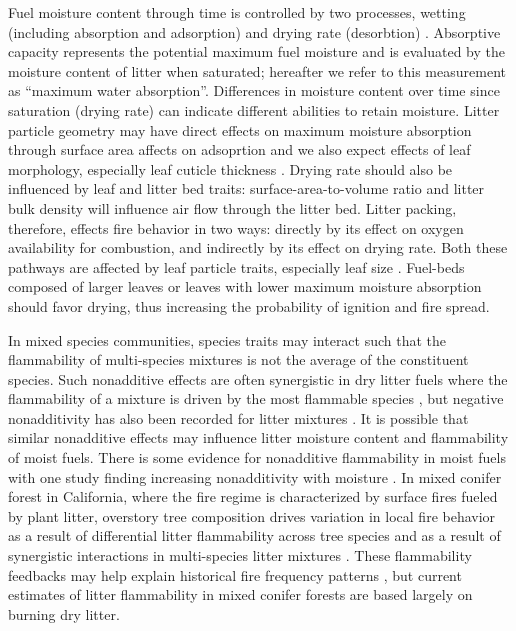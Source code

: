 \documentclass[letterpaper,12pt]{article}
\begin{document}
Fuel moisture content through time is controlled by two processes, wetting
(including absorption and adsorption) and drying rate (desorbtion)
\citep{Anderson-1990, Kreye+Kobziar+etal-2013}. Absorptive capacity represents
the potential maximum fuel moisture and is evaluated by the moisture content of
litter when saturated; hereafter we refer to this measurement as ``maximum
water absorption''. Differences in moisture content over time since saturation
(drying rate) can indicate different abilities to retain moisture. Litter
particle geometry may have direct effects on maximum moisture absorption
through surface area affects on adsoprtion and we also expect effects of leaf
morphology, especially leaf cuticle thickness \citep{Van_Wagner-1969}. Drying
rate should also be influenced by leaf and litter bed traits:
surface-area-to-volume ratio and litter bulk density will influence air flow
through the litter bed. Litter packing, therefore, effects fire behavior in two
ways: directly by its effect on oxygen availability for combustion, and
indirectly by its effect on drying rate. Both these pathways are affected by
leaf particle traits, especially leaf size \citep{Scarff+Westoby-2006}.
Fuel-beds composed of larger leaves or leaves with lower maximum moisture absorption
should favor drying, thus increasing the probability of ignition and fire
spread.

In mixed species communities, species traits may interact such that the
flammability of multi-species mixtures is not the average of the constituent
species. Such nonadditive effects are often synergistic in dry litter fuels
where the flammability of a mixture is driven by the most flammable species
\citep{VanAltena+Logtestjin+etal-2012, Magalhaes+Schwilk-2012}, but negative
nonadditivity has also been recorded for litter mixtures
\citep{Blauw+Wensink+etal-2015, Zhao+vanLogtestijn+etal-2019}. It is possible
that similar nonadditive effects may influence litter moisture content and
flammability of moist fuels. There is some evidence for nonadditive
flammability in moist fuels with one study finding increasing nonadditivity
with moisture \citep{Blauw+Wensink+etal-2015}. In mixed conifer forest in
California, where the fire regime is characterized by surface fires fueled by
plant litter, overstory tree composition drives variation in local fire
behavior \citep{Schwilk+Caprio-2011} as a result of differential litter
flammability across tree species and as a result of synergistic interactions in
multi-species litter mixtures \citep{Magalhaes+Schwilk-2012}. These
flammability feedbacks may help explain historical fire frequency patterns
\citep{Schwilk+Caprio-2011}, but current estimates of litter flammability in
mixed conifer forests are based largely on burning dry litter.
\end{document}
